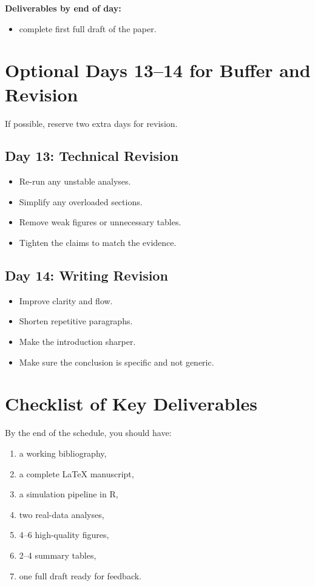 \documentclass[11pt]{article}
\begin{document}
\textbf{Deliverables by end of day:}
\begin{itemize}
    \item complete first full draft of the paper.
\end{itemize}

\section{Optional Days 13--14 for Buffer and Revision}
If possible, reserve two extra days for revision.

\subsection*{Day 13: Technical Revision}
\begin{itemize}
    \item Re-run any unstable analyses.
    \item Simplify any overloaded sections.
    \item Remove weak figures or unnecessary tables.
    \item Tighten the claims to match the evidence.
\end{itemize}

\subsection*{Day 14: Writing Revision}
\begin{itemize}
    \item Improve clarity and flow.
    \item Shorten repetitive paragraphs.
    \item Make the introduction sharper.
    \item Make sure the conclusion is specific and not generic.
\end{itemize}

\section{Checklist of Key Deliverables}
By the end of the schedule, you should have:
\begin{enumerate}[label=(\arabic*)]
    \item a working bibliography,
    \item a complete LaTeX manuscript,
    \item a simulation pipeline in R,
    \item two real-data analyses,
    \item 4--6 high-quality figures,
    \item 2--4 summary tables,
    \item one full draft ready for feedback.
\end{enumerate}
\end{document}
